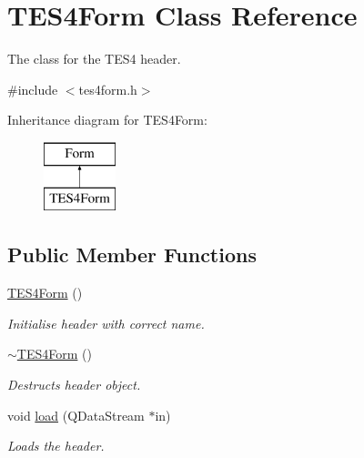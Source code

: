 \hypertarget{class_t_e_s4_form}{}\section{T\+E\+S4\+Form Class Reference}
\label{class_t_e_s4_form}


The class for the T\+E\+S4 header.  




{\ttfamily \#include $<$tes4form.\+h$>$}

Inheritance diagram for T\+E\+S4\+Form\+:\begin{figure}[H]
\begin{center}
\leavevmode
\includegraphics[height=2.000000cm]{class_t_e_s4_form}
\end{center}
\end{figure}
\subsection*{Public Member Functions}
\begin{DoxyCompactItemize}
\item 
\hyperlink{class_t_e_s4_form_a5d6ded3ee737f8bef51b9ae6bfc77c37}{T\+E\+S4\+Form} ()
\begin{DoxyCompactList}\small\item\em Initialise header with correct name. \end{DoxyCompactList}\item 
\hyperlink{class_t_e_s4_form_a634ebfa0b990061b23a158ab4192c140}{$\sim$\+T\+E\+S4\+Form} ()
\begin{DoxyCompactList}\small\item\em Destructs header object. \end{DoxyCompactList}\item 
void \hyperlink{class_t_e_s4_form_a1c485919edc03e15e2d346e1f61a8957}{load} (Q\+Data\+Stream $\ast$in)
\begin{DoxyCompactList}\small\item\em Loads the header. \end{DoxyCompactList}\end{DoxyCompactItemize}
